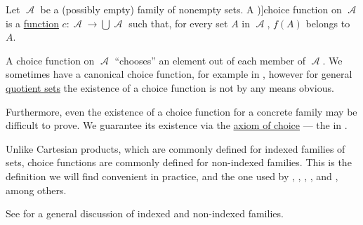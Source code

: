 \begin{definition}\label{def:choice_function}
  Let \( \mscrA \) be a (possibly empty) family of nonempty sets. A \term[ru=функция выбора (\cite[136]{Герасимов2011Вычислимость})]{choice function} on \( \mscrA \) is a \hyperref[def:function]{function} \( c: \mscrA \to \bigcup \mscrA \) such that, for every set \( A \) in \( \mscrA \), \( f(A) \) belongs to \( A \).
\end{definition}
\begin{comments}
  \item A choice function on \( \mscrA \) \enquote{chooses} an element out of each member of \( \mscrA \). We sometimes have a canonical choice function, for example in , however for general \hyperref[def:equivalence_relation/quotient]{quotient sets} the existence of a choice function is not by any means obvious.

  \item Furthermore, even the existence of a choice function for a concrete family may be difficult to prove. We guarantee its existence via the \hyperref[def:zfc/choice]{axiom of choice} --- the  in .

  \item Unlike Cartesian products, which are commonly defined for indexed families of sets, choice functions are commonly defined for non-indexed families. This is the definition we will find convenient in practice, and the one used by
  ,
  ,
  ,
  ,
   and
  ,
  among others.

  See  for a general discussion of indexed and non-indexed families.
\end{comments}

